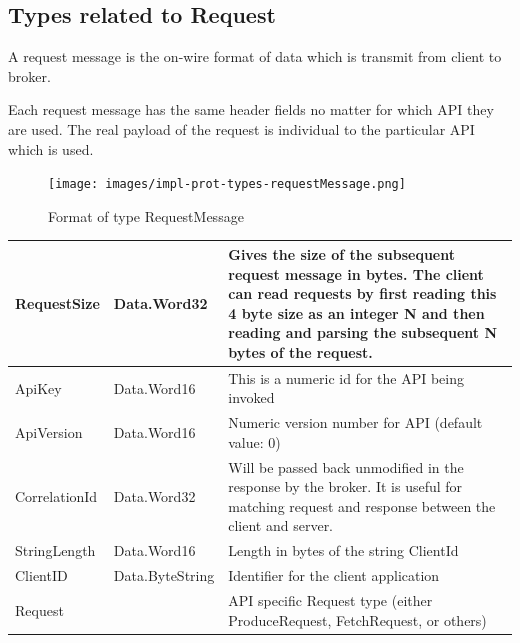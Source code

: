 \subsection{Types related to Request}
A request message is the on-wire format of data which is transmit from client to
broker.

Each request message has the same header fields no matter for which API they are
used.  The real payload of the request is individual to the particular API which
is used.

\begin{figure}[H]
    \centering
    \texttt{[image: images/impl-prot-types-requestMessage.png]}
    \caption{Format of type RequestMessage}
    \label{fig:impl-prot-types-requestMessage}
\end{figure}

\begin{table}[H]
\centering
\begin{tabular}{ l  l p{8.5cm} }
\hline
RequestSize   & Data.Word32     & Gives the size of the subsequent request message in bytes. The client can read requests by first reading this 4 byte size as an integer N and then reading and parsing the subsequent N bytes of the request. \\ \hline
ApiKey        & Data.Word16     & This is a numeric id for the API being invoked                                                                                                                                                              \\ \hline
ApiVersion    & Data.Word16     & Numeric version number for API (default value: 0)                                                                                                                                                                          \\ \hline
CorrelationId & Data.Word32     & Will be passed back unmodified in the response by the broker. It is useful for matching request and response between the client and server.                                                                   \\ \hline
StringLength  & Data.Word16     & Length in bytes of the string ClientId                                                                                                                                                                          \\ \hline
ClientID      & Data.ByteString & Identifier for the client application                                                                                                                                                                         \\ \hline
Request       &                 & API specific Request type (either ProduceRequest, FetchRequest, or others)                                                                                                                                    \\ \hline
\end{tabular}
\end{table}


